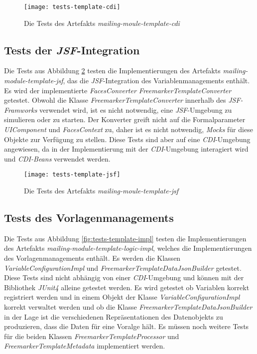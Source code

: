 \begin{figure}[h]
\centering
\texttt{[image: tests-template-cdi]}
\caption{Die Tests des Artefakts \emph{mailing-moule-template-cdi}}
\label{fig:tests-template-cdi}
\end{figure}

\subsection{Tests der \emph{JSF}-Integration}
Die Tests aus Abbildung \ref{fig:tests-template-jsf} testen die Implementierungen des Artefakts \emph{mailing-module-template-jsf}, das die \emph{JSF}-Integration des Variablenmanagements enthält. Es wird der implementierte \emph{FacesConverter FreemarkerTemplateConverter} getestet. Obwohl die Klasse \emph{FreemarkerTemplateConverter} innerhalb des \emph{JSF-Framworks} verwendet wird, ist es nicht notwendig, eine \emph{JSF}-Umgebung zu simulieren oder zu starten. Der Konverter greift nicht auf die Formalparameter \emph{UIComponent} und \emph{FacesContext} zu, daher ist es nicht notwendig, \emph{Mocks} für diese Objekte zur Verfügung zu stellen. Diese Tests sind aber auf eine \emph{CDI}-Umgebung angewiesen, da in der Implementierung mit der \emph{CDI}-Umgebung interagiert wird und \emph{CDI-Beans} verwendet werden.

\begin{figure}[h]
\centering
\texttt{[image: tests-template-jsf]}
\caption{Die Tests des Artefakts \emph{mailing-moule-template-jsf}}
\label{fig:tests-template-jsf}
\end{figure}

\subsection{Tests des Vorlagenmanagements}
Die Tests aus Abbildung \ref{fig:tests-template-impl} testen die Implementierungen des Artefakts \emph{mailing-module-template-logic-impl}, welches die Implementierungen des Vorlagenmanagements enthält. Es werden die Klassen \emph{VariableConfigurationImpl} und \emph{FreemarkerTemplateDataJsonBuilder}  getestet.
\newline
\newline
Diese Tests sind nicht abhängig von einer \emph{CDI}-Umgebung und können mit der Bibliothek \emph{JUnit4} alleine getestet werden. Es wird getestet ob Variablen korrekt registriert werden und in einem Objekt der Klasse \emph{VariableConfigurationImpl} korrekt verwaltet werden und ob die Klasse \emph{FreemarkerTemplateDataJsonBuilder} in der Lage ist die verschiedenen Repräsentationen des Datenobjekts zu produzieren, dass die Daten für eine Voralge hält.
\newline
\newline
Es müssen noch weitere Tests für die beiden Klassen \emph{FreemarkerTemplateProcessor} und \emph{FreemarkerTemplateMetadata} 
implementiert werden.
\newpage

